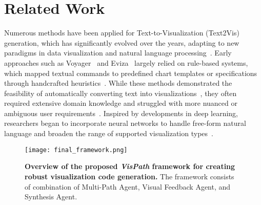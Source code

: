 \section{Related Work}
Numerous methods have been applied for Text-to-Visualization (Text2Vis) generation, which has significantly evolved over the years, adapting to new paradigms in data visualization and natural language processing~\cite{dibia2019data2vis,wu2022nuwa,chen2022type,chen2022nl2interface,rashid2022text2chart,zhang2024chartifytext}. Early approaches such as Voyager~\cite{wongsuphasawat2015voyager} and Eviza~\cite{setlur2016eviza} largely relied on rule-based systems, which mapped textual commands to predefined chart templates or specifications through handcrafted heuristics~\cite{de2020vismaker}. While these methods demonstrated the feasibility of automatically converting text into visualizations~\cite{moritz2018formalizing,cui2019text}, they often required extensive domain knowledge and struggled with more nuanced or ambiguous user requirements~\cite{li2021kg4vis,wang2023llm4vis}. Inspired by developments in deep learning, researchers began to incorporate neural networks to handle free-form natural language and broaden the range of supported visualization types~\cite{liu2021advisor,luo2021natural}. 


\begin{figure*}[!htpb]
    \centering
    \texttt{[image: final\_framework.png]}
    \caption{\textbf{Overview of the proposed \emph{VisPath} framework for creating robust visualization code generation.} The framework consists of combination of Multi-Path Agent, Visual Feedback Agent, and Synthesis Agent.}
    \label{fig:vispath-main}
\end{figure*}


